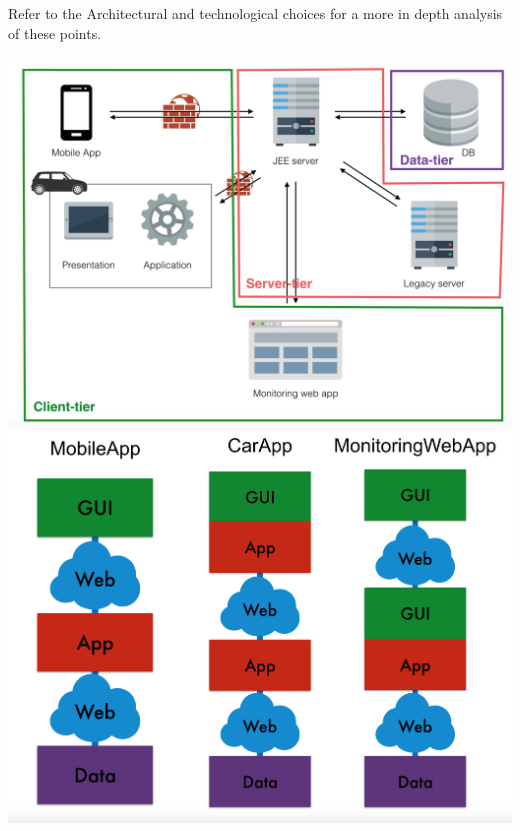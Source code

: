 \documentclass[]{article}
\begin{document}
Refer to the Architectural and technological choices for a more in depth
analysis of these points.

\includegraphics[width=1.00000\textwidth,height=1.00000\textwidth]{./images/sysApp.png}
\includegraphics[width=1.00000\textwidth,height=1.00000\textwidth]{./images/layers.png}
\end{document}
